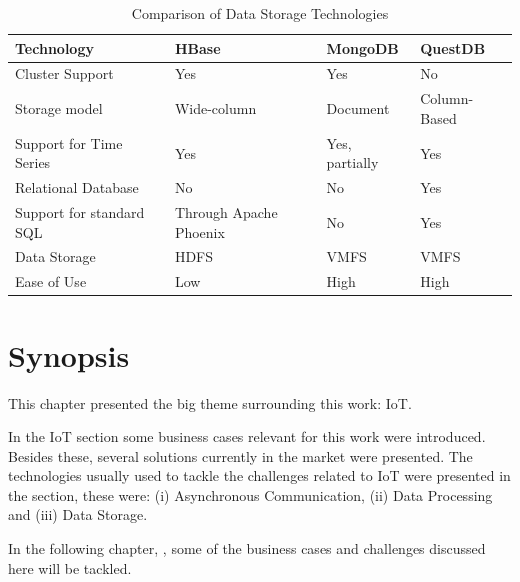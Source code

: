 \begin{table}[H]
    \centering
    \caption{Comparison of Data Storage Technologies}
    \label{tab:stateofart:tech:storage:comp:comp}
    \begin{tabular}{@{}llll@{}}
    \toprule
    \textbf{Technology}      & \textbf{HBase}         & \textbf{MongoDB}            & \textbf{QuestDB}            \\ \midrule
    Cluster Support          & Yes                    & Yes                         & No                          \\
    Storage model            & Wide-column            & Document                    & Column-Based                \\
    Support for Time Series  & Yes                    & Yes, partially              & Yes                         \\
    Relational Database      & No                     & No                          & Yes                         \\
    Support for standard SQL & Through Apache Phoenix & No                          & Yes                         \\
    Data Storage             & HDFS                   & VMFS                        & VMFS                        \\
    Ease of Use              & Low                    & High                        & High                        \\ \bottomrule
    \end{tabular}
\end{table}

\section{Synopsis}
\label{sec:stateofart:synopsis}

This chapter presented the big theme surrounding this work: \gls{IoT}.

In the \gls{IoT} section some business cases relevant for this work were introduced. Besides these, several solutions currently in the market were presented.
The technologies usually used to tackle the challenges related to \gls{IoT} were presented in the  section, these were: (i) Asynchronous Communication, (ii) Data Processing and (iii) Data Storage.

In the following chapter, , some of the business cases and challenges discussed here will be tackled.
